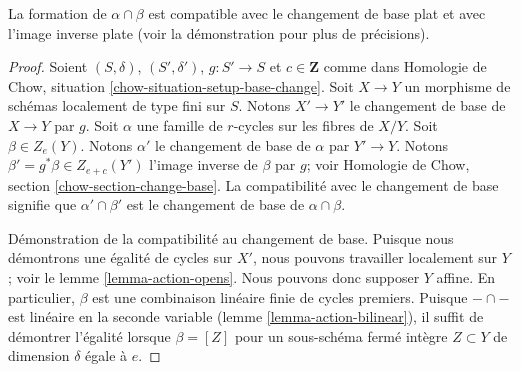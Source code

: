 \begin{lemma} 
\label{lemma-action-base-change} La 
formation de $\alpha \cap \beta$ est compatible avec le changement de base plat et avec 
l'image inverse plate (voir la démonstration pour plus de précisions). 
\end{lemma} 

\begin{proof} 
Soient $(S, \delta)$, $(S', \delta')$, $g : S' \to S$ et $c \in \mathbf{Z}$
 comme dans Homologie de Chow, situation \ref{chow-situation-setup-base-change}. 
Soit $X \to Y$ un morphisme de schémas localement de type fini sur $S$.
 Notons $X' \to Y'$ le changement de base de $X \to Y$ par $g$.
 Soit $\alpha$ une famille de $r$-cycles sur les fibres de $X/Y$.
 Soit $\beta \in Z_e(Y)$. Notons $\alpha'$ le 
changement de base de $\alpha$ par $Y' \to Y$. Notons 
$\beta' = g^*\beta \in Z_{e + c}(Y')$ l'image inverse de $\beta$ par $g$; voir
 Homologie de Chow, section \ref{chow-section-change-base}. La 
compatibilité avec le changement de base signifie que 
$\alpha' \cap \beta'$ est le changement de base de $\alpha \cap \beta$. 

\medskip\noindent
 Démonstration de la compatibilité au changement 
de base. Puisque nous démontrons une égalité de cycles sur $X'$, nous pouvons travailler localement
 sur $Y$; voir le lemme \ref{lemma-action-opens}. Nous pouvons donc supposer $Y$
 affine. En particulier, $\beta$ est une combinaison linéaire finie de cycles 
premiers. Puisque $- \cap -$ est linéaire en la seconde variable
 (lemme \ref{lemma-action-bilinear}), il suffit de 
démontrer l'égalité lorsque $\beta = [Z]$ pour un sous-schéma fermé intègre 
$Z \subset Y$ de dimension $\delta$ égale à $e$. 


\end{proof}
